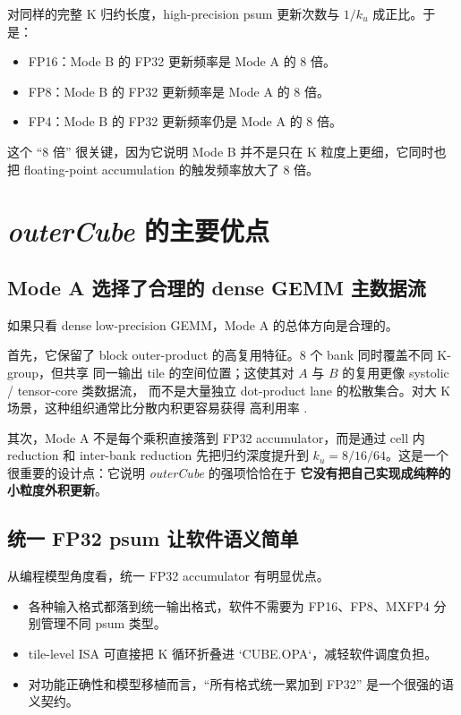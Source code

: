 \documentclass[UTF8,11pt,a4paper]{ctexart}
\newcommand{\ku}{\ensuremath{k_u}}
\newcommand{\modea}{Mode A}
\newcommand{\modeb}{Mode B}
\newcommand{\outercube}{\textit{outerCube}}
\begin{document}
对同样的完整 K 归约长度，high-precision psum 更新次数与 $1/\ku$ 成正比。于是：

\begin{itemize}
  \item FP16：\modeb{} 的 FP32 更新频率是 \modea{} 的 8 倍。
  \item FP8：\modeb{} 的 FP32 更新频率是 \modea{} 的 8 倍。
  \item FP4：\modeb{} 的 FP32 更新频率仍是 \modea{} 的 8 倍。
\end{itemize}

这个 ``8 倍'' 很关键，因为它说明 \modeb{} 并不是只在 K 粒度上更细，它同时也把 floating-point
accumulation 的触发频率放大了 8 倍。

\section{\outercube{} 的主要优点}

\subsection{\modea{} 选择了合理的 dense GEMM 主数据流}

如果只看 dense low-precision GEMM，\modea{} 的总体方向是合理的。

首先，它保留了 block outer-product 的高复用特征。8 个 bank 同时覆盖不同 K-group，但共享
同一输出 tile 的空间位置；这使其对 $A$ 与 $B$ 的复用更像 systolic / tensor-core 类数据流，
而不是大量独立 dot-product lane 的松散集合。对大 K 场景，这种组织通常比分散内积更容易获得
高利用率 \cite{tpu,blis}.

其次，\modea{} 不是每个乘积直接落到 FP32 accumulator，而是通过 cell 内 reduction 和
inter-bank reduction 先把归约深度提升到 $\ku=8/16/64$。这是一个很重要的设计点：它说明
\outercube{} 的强项恰恰在于 \textbf{它没有把自己实现成纯粹的小粒度外积更新}。

\subsection{统一 FP32 psum 让软件语义简单}

从编程模型角度看，统一 FP32 accumulator 有明显优点。

\begin{itemize}
  \item 各种输入格式都落到统一输出格式，软件不需要为 FP16、FP8、MXFP4 分别管理不同 psum 类型。
  \item tile-level ISA 可直接把 K 循环折叠进 `CUBE.OPA`，减轻软件调度负担。
  \item 对功能正确性和模型移植而言，``所有格式统一累加到 FP32'' 是一个很强的语义契约。
\end{itemize}
\end{document}
